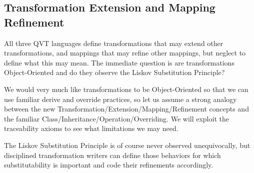 \documentclass[runningheads,a4paper]{llncs}
\begin{document}




\subsection{Transformation Extension and Mapping Refinement}

All three QVT languages define transformations that may extend other transformations, and mappings that may refine other mappings, but neglect to define what this may mean. The immediate question is are transformations Object-Oriented and do they observe the Liskov Substitution Principle\cite{liskovSubstitutionPrinciple}? 

We would very much like transformations to be Object-Oriented so that we can use familiar derive and override practices, so let us assume a strong analogy between the new Transformation/Extension/Mapping/Refinement concepts and the familiar Class/Inheritance/Operation/Overriding. We will exploit the traceability axioms to see what limitations we may need.

The Liskov Substitution Principle is of course never observed unequivocally, but disciplined transformation writers can define those behaviors for which substitutability is important and code their refinements accordingly.
\end{document}
